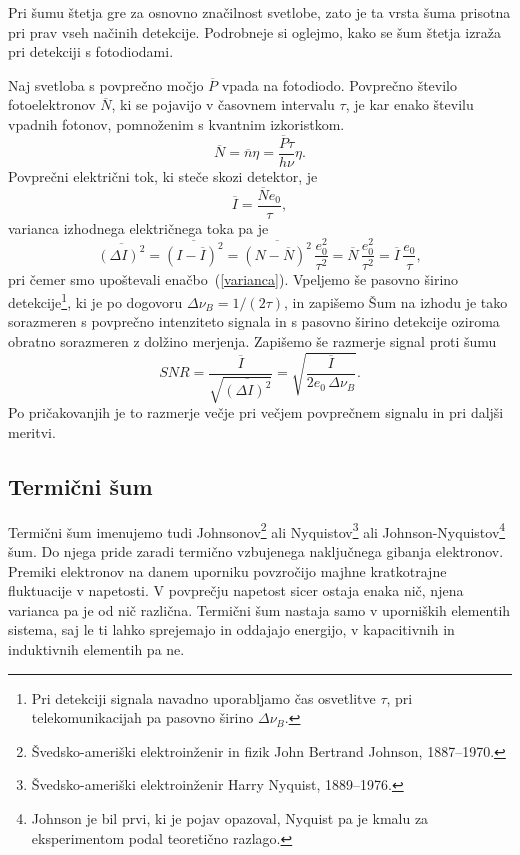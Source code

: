Pri šumu štetja gre za osnovno značilnost svetlobe, zato je ta vrsta šuma
prisotna pri prav vseh načinih detekcije. Podrobneje si oglejmo, 
kako se šum štetja izraža pri detekciji s fotodiodami. 

Naj svetloba s povprečno močjo $\overline{P}$ vpada na fotodiodo.
Povprečno število fotoelektronov $\overline{N}$, ki se pojavijo v časovnem intervalu 
$\tau$, je kar enako številu vpadnih fotonov, pomnoženim 
s kvantnim izkoristkom. 
\begin{equation}
\overline{N} = \overline{n}\eta = \frac{\overline{P}\tau}{h \nu}\eta.
\end{equation}
Povprečni električni tok, ki steče skozi detektor, je  
\begin{equation}
\overline{I} = \frac{\overline{N} e_0}{\tau},
\end{equation}
varianca izhodnega električnega toka pa je
\begin{equation}
\overline{(\Delta I)^2}=\overline{(I-\overline{I})^2} = \overline{(N-\overline{N})^2}\,
\frac{e_0^2}{\tau^2} = \overline{N}\,\frac{e_0^2}{\tau^2}= \overline{I}\,\frac{e_0}{\tau},
\end{equation}
pri čemer smo upoštevali enačbo~(\ref{varianca}). Vpeljemo še pasovno širino 
detekcije\footnote{Pri detekciji signala navadno uporabljamo
čas osvetlitve $\tau$, pri telekomunikacijah pa pasovno širino $\Delta\nu_B$.}, ki je po 
dogovoru $\Delta\nu_B = 1/(2\tau)$,
in zapišemo
Šum na izhodu je tako sorazmeren s povprečno intenziteto signala in 
s pasovno širino detekcije oziroma obratno sorazmeren z dolžino 
merjenja. Zapišemo še razmerje signal proti šumu 
\begin{equation}
SNR = \frac{\overline{I}}{\sqrt{\overline{(\Delta I)^2}}}= \sqrt{\frac{\overline{I}}
{2 e_0\, \Delta\nu_B}}.
\label{SNRs}
\end{equation}
Po pričakovanjih je to razmerje večje pri večjem povprečnem signalu in pri daljši meritvi.

\subsection*{Termični šum} 
Termični šum 
imenujemo tudi Johnsonov\footnote{Švedsko-ameriški elektroinženir in fizik 
John Bertrand Johnson, 1887--1970.} ali Nyquistov\footnote{Švedsko-ameriški elektroinženir
Harry Nyquist, 1889--1976.} ali Johnson-Nyquistov\footnote{Johnson je bil prvi, 
ki je pojav opazoval, 
Nyquist pa je kmalu za eksperimentom podal teoretično razlago.} šum. 
Do njega pride zaradi termično vzbujenega naključnega gibanja elektronov. Premiki elektronov
na danem uporniku povzročijo majhne kratkotrajne 
fluktuacije v napetosti. V povprečju napetost sicer ostaja enaka nič, njena varianca pa je od 
nič različna. 
Termični šum nastaja samo v uporniških elementih sistema, saj le ti lahko
sprejemajo in oddajajo energijo, v kapacitivnih in induktivnih elementih pa ne.

